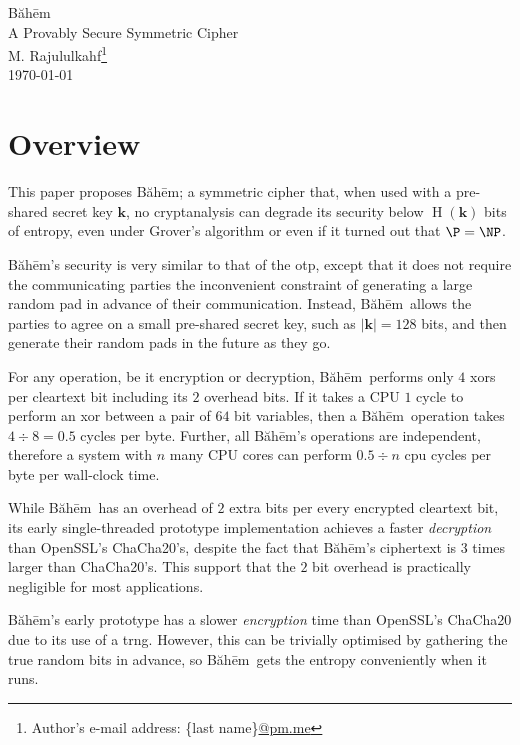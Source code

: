 \documentclass[twocolumn]{article}
\newcommand{\baheem}{Băhēm}
\DeclareMathOperator{\entropy}{H}
\begin{document}
\begin{center}
    \Huge
    \baheem\\
    \Large
    A Provably Secure Symmetric Cipher\\
    \normalsize
    \vspace{0.5em}
    M. Rajululkahf\footnote{Author's e-mail address: \{last
    name\}\url{@pm.me}}\\
    \vspace{0.5em}
    \footnotesize
    \today\\
\end{center}

\section*{Overview}
This paper proposes \baheem;  a symmetric cipher that, when used with a
pre-shared secret key $\mathbf{k}$, no cryptanalysis can degrade its
security below $\entropy(\mathbf{k})$ bits of entropy, even under Grover's
algorithm \cite{10.1145/237814.237866} or even if it turned out that $\P =
\NP$.

\baheem's security is very similar to that of the \gls{otp}, except that it
does not require the communicating parties the inconvenient constraint of
generating a large random pad in advance of their communication. Instead,
\baheem\ allows the parties to agree on a small pre-shared secret key, such
as $|\mathbf{k}| = 128$ bits, and then generate their random pads in the
future as they go.

For any operation, be it encryption or decryption, \baheem\ performs only
$4$ \glspl{xor} per cleartext bit including its $2$ overhead bits.  If it
takes a CPU $1$ cycle to perform an \gls{xor} between a pair of $64$ bit
variables, then a \baheem\ operation takes $4 \div 8 = 0.5$ cycles
per byte.  Further, all \baheem's operations are independent, therefore a
system with $n$ many CPU cores can perform $0.5 \div n$ cpu cycles per byte
per wall-clock time.

While \baheem\ has an overhead of $2$ extra bits per every encrypted
cleartext bit, its early single-threaded prototype implementation achieves
a faster \emph{decryption} than OpenSSL's ChaCha20's, despite the fact that
\baheem's ciphertext is $3$ times larger than ChaCha20's.  This support
that the $2$ bit overhead is practically negligible for most applications.

\baheem's early prototype has a slower \emph{encryption} time than
OpenSSL's ChaCha20 due to its use of a \gls{trng}.  However, this can be
trivially optimised by gathering the true random bits in advance, so
\baheem\ gets the entropy conveniently when it runs.
\end{document}
